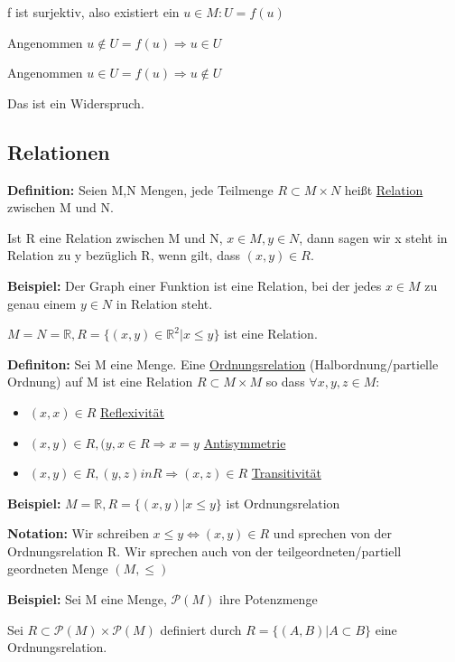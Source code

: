 \documentclass[pdftex,12pt,a4paper,fleqn]{scrartcl}
\begin{document}
f ist surjektiv, also existiert ein $u \in M: U = f(u)$

Angenommen $u \notin U = f(u) \Rightarrow u \in U$

Angenommen $u \in U = f(u) \Rightarrow u \notin U$

Das ist ein Widerspruch.

\subsection{Relationen} %
\label{sub:relationen}

\textbf{Definition:} Seien M,N Mengen, jede Teilmenge $R \subset M \times N$ heißt \underline{Relation} zwischen M und N.

Ist R eine Relation zwischen M und N, $x \in M, y \in N$, dann sagen wir x steht in Relation zu y bezüglich R, wenn gilt, dass $(x,y) \in R$.

\textbf{Beispiel:} Der Graph einer Funktion ist eine Relation, bei der jedes $x \in M$ zu genau einem $y \in N$ in Relation steht.

$M = N = \mathbb{R}, R = \{(x,y) \in \mathbb{R}^2 | x \leq y\}$ ist eine Relation.

\textbf{Definiton:} Sei M eine Menge. Eine \underline{Ordnungsrelation} (Halbordnung/partielle Ordnung) auf M ist eine Relation $R \subset M \times M$ so dass $\forall x,y,z \in M:$

\begin{itemize}
     \item $(x,x) \in R$ \underline{Reflexivität}
     \item $(x,y) \in R, (y,x \in R \Rightarrow x=y$ \underline{Antisymmetrie}
     \item $(x,y) \in R, (y,z) in R \Rightarrow (x,z) \in R$ \underline{Transitivität}
 \end{itemize} 

 \textbf{Beispiel:} $M = \mathbb{R}, R = \{(x,y) | x \leq y\}$ ist Ordnungsrelation

 \textbf{Notation:} Wir schreiben $x \leq y \Leftrightarrow (x,y) \in R$ und sprechen von der Ordnungsrelation R. Wir sprechen auch von der teilgeordneten/partiell geordneten Menge $(M,\leq)$

 \textbf{Beispiel:} Sei M eine Menge, $\mathcal{P}(M)$ ihre Potenzmenge

 Sei $R \subset \mathcal{P}(M) \times \mathcal{P}(M)$ definiert durch $R = \{(A,B) | A \subset B\}$ eine Ordnungsrelation.

\end{document}
